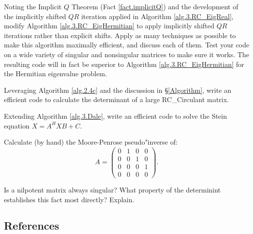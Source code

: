 \begin{exercise} \label{ex:04.impshiftherm} \rm Noting the Implicit $Q$ Theorem (Fact \ref{fact.implicitQ}) and the development of the implicitly shifted $QR$ iteration
applied in Algorithm \ref{alg.3.RC_EigReal}, modify Algorithm \ref{alg.3.RC_EigHermitian} to apply implicitly shifted $QR$ iterations rather than explicit shifts.  Apply as many
techniques as possible to make this algorithm maximally efficient, and discuss each of them.  Test your code on a wide variety of singular and nonsingular matrices
to make sure it works.  The resulting code will in fact be superior to Algorithm \ref{alg.3.RC_EigHermitian} for the Hermitian eigenvalue problem.
\end{exercise}

\begin{exercise} \label{ex:04.det} \rm Leveraging Algorithm \ref{alg.2.4c} and the discussion in \S \ref{Algorithm},
write an efficient code to calculate the determinant of a large RC_Circulant matrix.
\end{exercise}

\begin{exercise} \label{ex:04.stein} \rm Extending Algorithm \ref{alg.3.Dale}, write an efficient code to solve the Stein equation $X = A^H X B + C$.
\end{exercise}

\begin{exercise} \label{ex:04.pseudoinverse} \rm Calculate (by hand) the Moore-Penrose pseudo"inverse of:
\begin{equation*}
A=\begin{pmatrix} 0 & 1 & 0 & 0\\ 0 & 0 & 1 & 0\\ 0 & 0 & 0 & 1\\ 0 & 0 & 0 & 0 \end{pmatrix}.
\end{equation*}
\end{exercise}

\begin{exercise} \label{ex:04.nilpotent.singular} \rm Is a nilpotent matrix always singular?  What property of the determinint establishes this fact most
directly?  Explain.
\end{exercise}

\subsection*{References}\label{sec:04.References}

